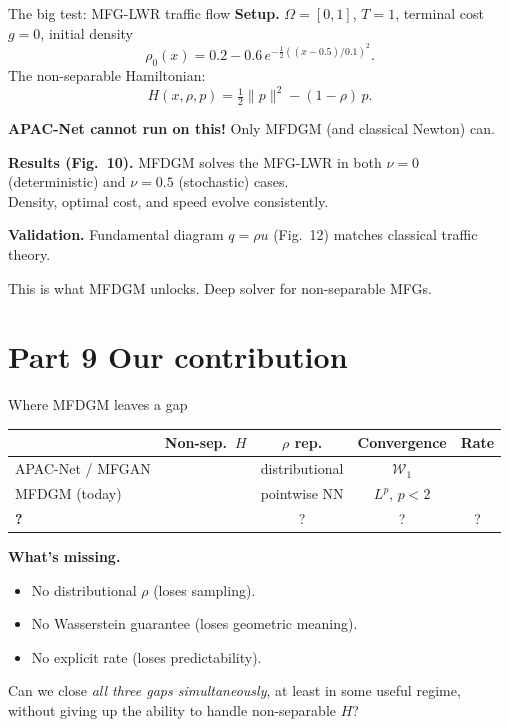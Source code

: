 \documentclass[10pt,aspectratio=169]{beamer}
\newcommand{\cmark}{\textcolor{kaustteal!80!black}{\ding{51}}}
\newcommand{\xmark}{\textcolor{accent}{\ding{55}}}
\newcommand{\W}{\mathcal{W}}
\newcommand{\teal}[1]{\textcolor{kaustteal}{#1}}
\newcommand{\blue}[1]{\textcolor{kaustblue}{#1}}
\begin{document}
\begin{frame}{The big test: MFG-LWR traffic flow}
\textbf{Setup.}  $\Omega=[0,1]$, $T=1$, terminal cost $g=0$,
initial density
\[
  \rho_0(x) = 0.2 - 0.6\,e^{-\tfrac12((x-0.5)/0.1)^2}.
\]
The \alert{non-separable} Hamiltonian:
\[
  H(x,\rho,p) = \tfrac12\|p\|^2 - (1-\rho)\,p.
\]

\medskip
\textbf{APAC-Net cannot run on this!}  Only MFDGM (and classical Newton) can.

\medskip
\textbf{Results (Fig.\ 10).}  MFDGM solves the MFG-LWR in both
$\nu=0$ (deterministic) and $\nu=0.5$ (stochastic) cases.\\
Density, optimal cost, and speed evolve consistently.

\medskip
\textbf{Validation.}  Fundamental diagram $q = \rho u$ (Fig.\ 12)
matches classical traffic theory.

\medskip
\teal{This is what MFDGM unlocks.}  Deep solver for non-separable MFGs.
\end{frame}

\section{Part 9 \;\textbar\; Our contribution}

\begin{frame}{Where MFDGM leaves a gap}
\begin{center}
\renewcommand{\arraystretch}{1.35}
\begin{tabular}{lcccc}
\toprule
& Non-sep.\ $H$ & $\rho$ rep. & Convergence & Rate \\
\midrule
APAC-Net / MFGAN     & \xmark               & \teal{distributional} & $\W_1$        & \xmark \\
MFDGM (today)        & \cmark               & \alert{pointwise NN} & \alert{$L^p,\,p<2$} & \xmark \\
\textbf{?}           & \cmark               & ?                    & ?             & ? \\
\bottomrule
\end{tabular}
\end{center}

\medskip
\textbf{What's missing.}
\begin{itemize}\setlength\itemsep{1pt}
  \item No \blue{distributional} $\rho$ (loses sampling).
  \item No \blue{Wasserstein} guarantee (loses geometric meaning).
  \item No \blue{explicit rate} (loses predictability).
\end{itemize}

\medskip
\begin{idea}[title=Question]
Can we close \emph{all three gaps simultaneously}, at least in some
useful regime, without giving up the ability to handle non-separable $H$?
\end{idea}
\end{frame}
\end{document}
